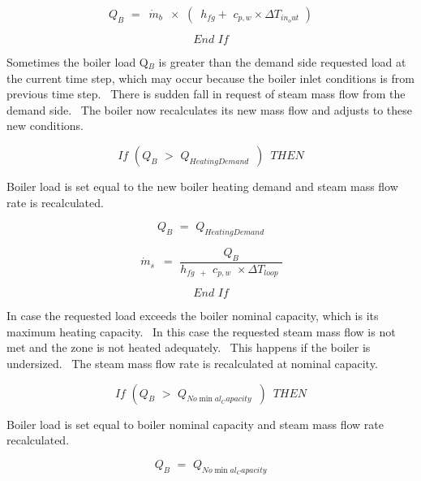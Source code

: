 \begin{equation}
{Q_B}\,\, = \,\,\,{\dot m_b}\,\,\, \times \,\,(\,\,\,{h_{fg}} + \,\,{c_{p,w}} \times \Delta {T_{in_out}}\,\,)
\end{equation}

\begin{equation}
End\,\,If
\end{equation}

Sometimes the boiler load Q\(_{B}\) is greater than the demand side requested load at the current time step, which may occur because the boiler inlet conditions is from previous time step.~ There is sudden fall in request of steam mass flow from the demand side.~ The boiler now recalculates its new mass flow and adjusts to these new conditions.

\begin{equation}
If\,\,({Q_B}\,\, > \,\,{Q_{HeatingDemand}}\,\,\,)\,\,\,THEN
\end{equation}

Boiler load is set equal to the new boiler heating demand and steam mass flow rate is recalculated.

\begin{equation}
{Q_B}\,\, = \,\,{Q_{HeatingDemand}}
\end{equation}

\begin{equation}
\,{\dot m_s}\,\,\, = \,\,\frac{{{Q_B}}}{{{h_{fg\,\,\, + }}\,\,{c_{p,w}}\,\, \times \Delta {T_{loop}}\,\,}}
\end{equation}

\begin{equation}
End\,\,If
\end{equation}

In case the requested load exceeds the boiler nominal capacity, which is its maximum heating capacity.~ In this case the requested steam mass flow is not met and the zone is not heated adequately.~ This happens if the boiler is undersized.~ The steam mass flow rate is recalculated at nominal capacity.

\begin{equation}
If\,\,({Q_B}\,\, > \,\,{Q_{No\min al_Capacity}}\,\,\,)\,\,\,THEN
\end{equation}

Boiler load is set equal to boiler nominal capacity and steam mass flow rate recalculated.

\begin{equation}
{Q_B}\,\, = \,\,{Q_{No\min al_Capacity}}
\end{equation}

